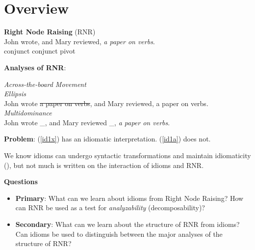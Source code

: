 \documentclass[paper=letter, fontsize=12pt]{scrartcl} %
\numberwithin{equation}{section} %
\numberwithin{figure}{section} %
\numberwithin{table}{section} %
\begin{document}
    
    
\section{Overview}

\begin{exe}
\ex \textbf{Right Node Raising} (RNR)
\\ John wrote, and Mary reviewed, \textit{a paper on verbs}.
\\ \hspace*{5pt} conjunct \hspace*{20pt} conjunct \hspace*{50pt} pivot
\end{exe}

\textbf{Analyses of RNR}:


\begin{exe}
\ex \textit{Across-the-board Movement} \\
\ex \textit{Ellipsis} \\
	John wrote \sout{a paper on verbs}, and Mary reviewed, a paper on verbs.
\ex \textit{Multidominance} \\
	John wrote \_, and Mary reviewed \_, \textit{a paper on verbs}.
\end{exe}

\textbf{Problem}: (\ref{id1x}) has an idiomatic interpretation. (\ref{id1a}) does not.

\begin{exe}
\ex \begin{xlista}
	\label{id1x}
	\label{id1a}
		\end{xlista}
\end{exe}

We know idioms can undergo syntactic transformations and maintain idiomaticity (\citealt{Fraser:1970,Machonis:1985,Gibbs:1989a}), but not much is written on the interaction of idioms and RNR.

\textbf{Questions}

\begin{itemize}
\item \textbf{Primary}: What can we learn about idioms from Right Node Raising? How can RNR be used as a test for \textit{analyzability} (decomposability)?
\item \textbf{Secondary}: What can we learn about the structure of RNR from idioms? Can idioms be used to distinguish between the major analyses of the structure of RNR?
\end{itemize}
\end{document}
